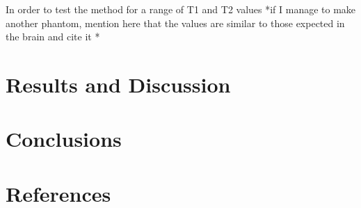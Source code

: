 \documentclass[review]{elsarticle}
\begin{document}
In order to test the method for a range of T1 and T2 values *if I manage to make another phantom, mention here that the values are similar to those expected in the brain and cite it *

\section{Results and Discussion}

\section{Conclusions}

\section*{References}


\end{document}
